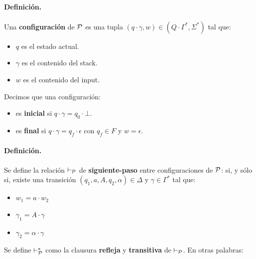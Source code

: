 \paragraph*{Definición.} Una \textbf{configuración} de $\mathcal{P}$ es una tupla $(q\cdot \gamma, w) \in (Q\cdot \Gamma^*, \Sigma^*)$ tal que:
\begin{itemize}
    \item $q$ es el estado actual.
    \item $\gamma$ es el contenido del stack.
    \item $w$ es el contenido del input.
\end{itemize}
Decimos que una configuración:
\begin{itemize}
    \item es \textbf{inicial} si $q\cdot \gamma = q_0\cdot \bot$.
    \item es \textbf{final} si $q\cdot \gamma = q_f\cdot \epsilon$ con $q_f \in F$ y $w=\epsilon$.
\end{itemize}

\paragraph*{Definición.} Se define la relación $\vdash_{\mathcal{P}}$ de \textbf{siguiente-paso} entre configuraciones de $\mathcal{P}$:
si, y sólo si, existe una transición $\left(q_1, a, A, q_2, \alpha\right) \in \Delta \text { y } \gamma \in \Gamma^*$ tal que:
\begin{itemize}
    \item $w_1 = a \cdot w_2$
    \item $\gamma_1 = A\cdot \gamma$
    \item $\gamma_2 = \alpha \cdot \gamma$
\end{itemize}

Se define $\vdash_{\mathcal{P}}^*$ como la clausura \textbf{refleja} y \textbf{transitiva} de $\vdash_{\mathcal{P}}$. En otras palabras:

